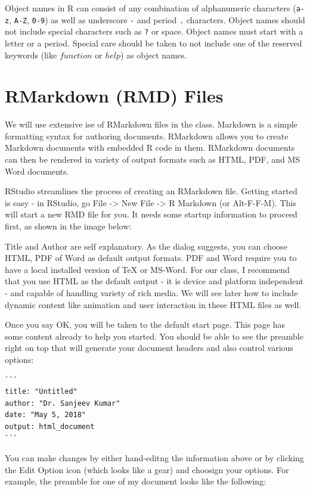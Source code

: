 \documentclass[10pt, letterpaper, twoside]{memoir}\usepackage{knitr}
\begin{document}
Object names in R can consist of any combination of alphanumeric characters (\texttt{a-z}, \texttt{A-Z}, \texttt{0-9}) as well as underscore \texttt{-} and period \texttt{.} characters. Object names should not include special characters such as \texttt{?} or space. Object names must start with a letter or a period. Special care should be taken to not include one of the reserved keywords (like $function$ or $help$) as object names.


\section{RMarkdown (RMD) Files}

We will use extensive ise of RMarkdown files in the class. Markdown is a simple formatting syntax for authoring documents. RMarkdown allows you to create Markdown documents with embedded R code in them. RMarkdown documents can then be rendered in variety of output formats such as HTML, PDF, and MS Word documents. 

RStudio streamlines the process of creating an RMarkdown file. Getting started is easy - in RStudio, go File -> New File -> R Markdown (or Alt-F-F-M). This will start a new RMD file for you. It needs some startup information to proceed first, as shown in the image below:


Title and Author are self explanatory. As the dialog suggests, you can choose HTML, PDF of Word as default output formats. PDF and Word require you to have a local installed version of TeX or MS-Word. For our class, I recommend that you use HTML as the default output - it is device and platform independent - and capable of handling variety of rich media. We will see later how to include dynamic content like animation and user interaction in these HTML files as well.

Once you say OK, you will be taken to the default start page. This page has some content already to help you started. You should be able to see the preamble right on top that will generate your document headers and also control various options:

\begin{verbatim}
```
title: "Untitled"
author: "Dr. Sanjeev Kumar"
date: "May 5, 2018"
output: html_document
```
\end{verbatim}

You can make changes by either hand-editng the information above or by clicking the Edit Option icon (which looks like a gear) and choosign your options. For example, the preamble for one of my document looks like the following:
\end{document}

